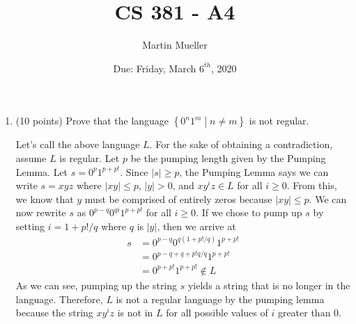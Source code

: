 \documentclass[12pt, letter]{article}
\title{CS 381 - A4}
\author{Martin Mueller}
\date{Due: Friday, March $6^{th}$, 2020}
\begin{document}
	\maketitle
	\begin{enumerate}
		\item (10 points) Prove that the language  $\left\{ \left. 0^n1^m \; \right| \; n \ne m \right\}$ is not regular.
		\begin{center}
			Let's call the above language $L$. For the sake of obtaining a contradiction, assume $L$ is regular. Let $p$ be the pumping length given by the Pumping Lemma. Let $s = 0^{p}1^{p + p!}$. Since $|s| \ge p$, the Pumping Lemma says we can write $s = xyz$ where $|xy| \le p$, $|y| > 0$, and $xy^{i}z \in L$ for all $i \ge 0$. From this, we know that $y$ must be comprised of entirely zeros because $|xy| \le p$. We can now rewrite $s$ as $0^{p - q}0^{qi}1^{p + p!}$ for all $i \ge 0$. If we chose to pump up $s$ by setting $i = 1 + p!/q$ where $q$ is $|y|$, then we arrive at
			\begin{align*}
				s &= 0^{p - q}0^{q(1 + p!/q)}1^{p + p!} \\
				&= 0^{p - q + q + p!q/q}1^{p + p!} \\
				&= 0^{p + p!}1^{p + p!} \not\in L
			\end{align*}
			As we can see, pumping up the string $s$ yields a string that is no longer in the language. Therefore, $L$ is not a regular language by the pumping lemma because the string $xy^{i}z$ is not in $L$ for all possible values of $i$ greater than 0.
		\end{center}
		\pagebreak


\end{enumerate}
\end{document}
